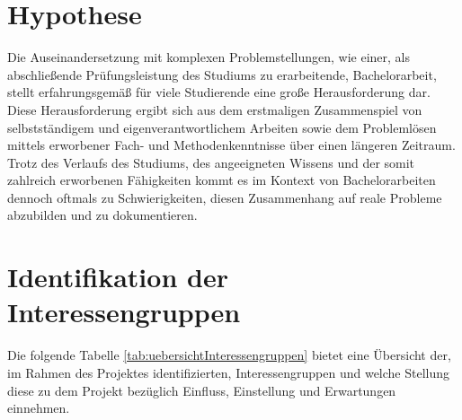 \documentclass[bibliography=totoc,listof=totoc,BCOR=5mm,DIV=12,oneside]{scrbook}
\begin{document}
\section{Hypothese}
\par Die Auseinandersetzung mit komplexen Problemstellungen, wie einer, als abschließende Prüfungsleistung des Studiums zu erarbeitende, Bachelorarbeit, stellt erfahrungsgemäß für viele Studierende eine große Herausforderung dar. Diese Herausforderung ergibt sich aus dem erstmaligen Zusammenspiel von selbstständigem und eigenverantwortlichem Arbeiten sowie dem Problemlösen mittels erworbener Fach- und Methodenkenntnisse über einen längeren Zeitraum.
Trotz des Verlaufs des Studiums, des angeeigneten Wissens und der somit zahlreich erworbenen Fähigkeiten kommt es im Kontext von Bachelorarbeiten dennoch oftmals zu Schwierigkeiten, diesen Zusammenhang auf reale Probleme abzubilden und zu dokumentieren.

\newpage
\section{Identifikation der Interessengruppen}
\par Die folgende Tabelle \ref{tab:uebersichtInteressengruppen} bietet eine Übersicht der, im Rahmen des Projektes identifizierten, Interessengruppen und welche Stellung diese zu dem Projekt bezüglich Einfluss, Einstellung und Erwartungen einnehmen.
\end{document}
